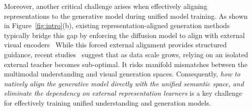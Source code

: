 \documentclass[runningheads]{llncs}
\newcommand{\lc}[1]{{\color{blue}{$^\textbf{\emph{Long:}}$[#1]}}}
\begin{document}

Moreover, another critical challenge arises when effectively aligning representations to the generative model during unified model training.
As shown in Figure~\ref{fig:intro}(b), existing representation-aligned generation methods~\cite{yu2025repa,va-vae} typically bridge this gap by enforcing the diffusion model to align with external visual encoders~\cite{oquab2023dinov2} While this forced external alignment provides structured guidance, recent studies~\cite{flux2-vae} suggest that as data scale grows, relying on an isolated external teacher becomes sub-optimal. It risks manifold mismatches between the multimodal understanding and visual generation spaces. Consequently, {\emph{how to natively align the generative model directly with the unified semantic space, and eliminate the dependency on external representation learners}} is a key challenge for effectively training unified understanding and generation models.
\end{document}
